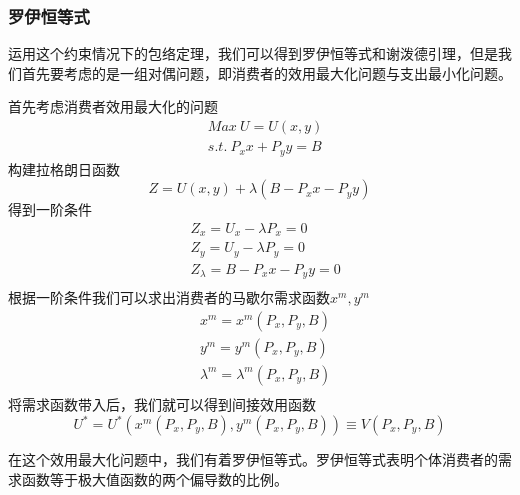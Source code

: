 \documentclass[UTF8,12pt]{ctexart}
\numberwithin{equation}{section} %
\numberwithin{figure}{section}
\numberwithin{table}{section}
\begin{document}
	\subsubsection{罗伊恒等式}
	运用这个约束情况下的包络定理，我们可以得到罗伊恒等式和谢泼德引理，但是我们首先要考虑的是一组对偶问题，即消费者的效用最大化问题与支出最小化问题。
	
	首先考虑消费者效用最大化的问题
	\begin{equation}
		\begin{aligned}
			&Max \ U = U(x,y) \\
			&s.t. \ P_xx + P_yy = B
		\end{aligned}
	\end{equation}
	构建拉格朗日函数
	\begin{equation}
		Z = U(x,y) + \lambda(B - P_xx - P_yy)
	\end{equation}
	得到一阶条件
	\begin{equation}
		\begin{aligned}
			&Z_x = U_x - \lambda P_x = 0 \\
			&Z_y = U_y - \lambda P_y = 0 \\
			&Z_{\lambda} = B - P_xx - P_yy = 0 \\
		\end{aligned}
	\end{equation}
	根据一阶条件我们可以求出消费者的马歇尔需求函数$x^m,y^m$
	\begin{equation}
		\begin{aligned}
			&x^m = x^m(P_x,P_y,B) \\
			&y^m = y^m(P_x,P_y,B) \\
			&\lambda^m = \lambda^m(P_x,P_y,B) \\
		\end{aligned}
	\end{equation}
	将需求函数带入后，我们就可以得到间接效用函数
	\begin{equation}
		U^* = U^*(x^m(P_x,P_y,B),y^m(P_x,P_y,B)) \equiv V(P_x,P_y,B)
	\end{equation}
	
	在这个效用最大化问题中，我们有着罗伊恒等式。罗伊恒等式表明个体消费者的需求函数等于极大值函数的两个偏导数的比例。
	
\end{document}
